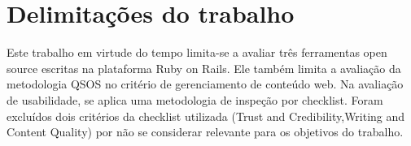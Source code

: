 \section{Delimitações do trabalho}

Este trabalho em virtude do tempo limita-se a avaliar três ferramentas open source escritas na plataforma Ruby on Rails. Ele também limita a avaliação da metodologia QSOS no critério de gerenciamento de conteúdo web. Na avaliação de usabilidade, se aplica uma metodologia de inspeção por checklist. Foram excluídos dois critérios da checklist utilizada (Trust and Credibility,Writing and Content Quality) por não se considerar relevante para os objetivos do trabalho.
